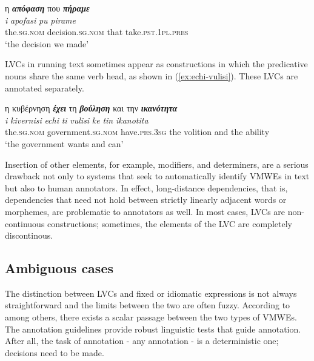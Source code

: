 \documentclass[output=paper,colorlinks,citecolor=brown]{langscibook}
\begin{document}
\ea
\label{ex:apofasi-pu-pirame}
\settowidth {}
\glll
η \textbf{\em{απόφαση}} που \textbf{\em{πήραμε}} \\
\textit{i} \textit{apofasi} \textit{pu} \textit{pirame} \\
the.\textsc{sg.nom} decision.\textsc{sg.nom} that take.\textsc{pst.1pl}.\textsc{pres} \\
\glt ‘the decision we made’
\z

LVCs in running text sometimes appear as constructions in which the predicative nouns share the same verb head, as shown in (\ref{ex:echi-vulisi}). These LVCs are annotated separately.

\ea
\label{ex:echi-vulisi}
\settowidth {}
\glll
η κυβέρνηση \textbf{\em{έχει}} τη \textbf{\em{βούληση}} και την \textbf{\em{ικανότητα}} \\
\textit{i} \textit{kivernisi} \textit{echi} \textit{ti} \textit{vulisi} \textit{ke} \textit{tin} \textit{ikanotita} \\
the.\textsc{sg.nom} government.\textsc{sg.nom} have.\textsc{prs.3sg} the volition and the ability \\
\glt `the government wants and can' \\
\z

Insertion of other elements, for example, modifiers, and determiners, are a serious drawback not only to systems that seek to automatically identify VMWEs in text but also to human annotators. In effect, long-distance dependencies, that is, dependencies that need not hold between strictly linearly adjacent words or morphemes, are problematic to annotators as well. In most cases, LVCs are non-continuous constructions; sometimes, the elements of the LVC are completely discontinous. %



\subsection{Ambiguous cases}

The distinction between LVCs and fixed or idiomatic expressions is not always straightforward and the limits between the two are often fuzzy. According to \citet{Fotopoulou-Giouli-2015} among others, there exists a scalar passage between the two types of VMWEs. The annotation guidelines provide robust linguistic tests that guide annotation. After all, the task of annotation - any annotation - is a deterministic one; decisions need to be made.
\end{document}
